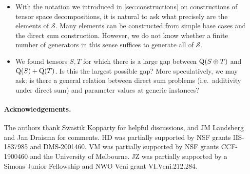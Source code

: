 \documentclass[11pt]{article}
\theoremstyle{definition}
\theoremstyle{remark}
\newcommand{\subrank}{{\rm Q}}
\begin{document}
\begin{itemize}
    \item With the notation we introduced in \autoref{sec:constructions} on constructions of tensor space decompositions, it is natural to ask what precisely are the elements of $\mathcal{S}$. Many elements can be constructed from simple base cases and the direct sum construction. However, we do not know whether a finite number of generators in this sense suffices to generate all of $\mathcal{S}$.
    \item We found tensors $S,T$ for which there is a large gap between $\subrank(S \oplus T)$ and $\subrank(S) + \subrank(T)$. Is this the largest possible gap? More speculatively, we may ask: is there a general relation between direct sum problems (i.e.~additivity under direct sum) and parameter values at generic instances?
\end{itemize}


\paragraph{Acknowledgements.}
The authors thank Swastik Kopparty for helpful discussions, and JM Landsberg and Jan Draisma for comments.
HD was partially supported by NSF grants IIS-1837985 and DMS-2001460. VM was partially supported by NSF grants CCF-1900460 and the University of Melbourne.
JZ was partially supported by a Simons Junior Fellowship and NWO Veni grant VI.Veni.212.284.



\end{document}
